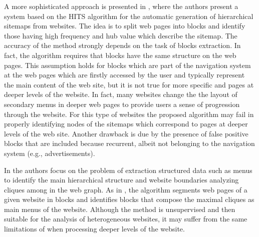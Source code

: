 A more sophisticated approach is presented in \cite{Lin:2011}, where the authors present a system based on the HITS algorithm for the automatic generation of hierarchical sitemaps from websites. The idea is to split web pages into blocks and identify those having high frequency and hub value which describe the sitemap. %
The accuracy of the method strongly depends on the task of blocks extraction. In fact, the algorithm requires that blocks have the same structure on the web pages. This assumption holds for blocks which are part of the navigation system at the web pages which are firstly accessed by the user and typically represent the main content of the web site, but it is not true for more specific and pages at deeper levels of the website. In fact, 
many websites change the the layout of secondary menus in deeper web pages to provide users a sense of progression through the website. For this type of websites the proposed algorithm may fail in properly identifying nodes of the sitemaps which correspond to pages at deeper levels of the web site. Another drawback is due by the presence of false positive blocks that are included because recurrent, albeit not belonging to the navigation system (e.g., advertisements).

In \cite{Keller:2012} the authors focus on the problem of extraction structured data such as menus to identify the main hierarchical structure and website boundaries analyzing cliques among in the web graph. As in \cite{Lin:2011}, the algorithm segments web pages of a given website in blocks and identifies blocks that compose the maximal cliques as main menus of the website. Although the method is unsupervised and then suitable for the analysis of heterogeneous websites, it may suffer from the same limitations of \cite{Lin:2011} when processing deeper levels of the website.




